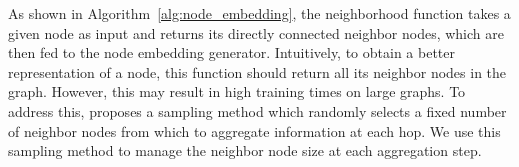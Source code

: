 \documentclass{article} \usepackage{iclr2019_conference,times}
\begin{document}
As shown in Algorithm~\ref{alg:node_embedding}, the neighborhood function takes a given node as input and returns its
directly connected neighbor nodes, which are then fed to the node embedding generator.
Intuitively, to obtain a better representation of a node, this function should return all its neighbor nodes in the graph. However, this may result in high training times on large graphs.
To address this, \citep{hamilton2017inductive} proposes a sampling method which randomly selects
a fixed number of neighbor nodes from which to aggregate information at each hop.
We use this sampling method to manage the neighbor node size at each aggregation step.
\end{document}
